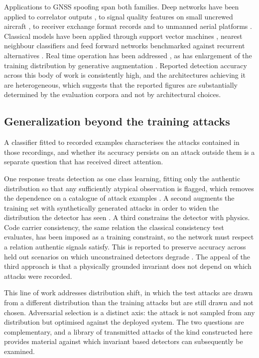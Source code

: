 Applications to GNSS spoofing span both families. Deep networks have been applied to
correlator outputs \citep{borhanidarian2024deep}, to signal quality features on small
uncrewed aircraft \citep{sung2022cnn}, to receiver exchange format records
\citep{romaniuc2025lstm} and to unmanned aerial platforms \citep{yang2025deep}. Classical
models have been applied through support vector machines \citep{chen2022svm}, nearest
neighbour classifiers \citep{mahroof2024ml} and feed forward networks benchmarked against
recurrent alternatives \citep{jullian2022deep}. Real time operation has been addressed
\citep{li2025realtime}, as has enlargement of the training distribution by generative
augmentation \citep{chen2025cgan}. Reported detection accuracy across this body of work is
consistently high, and the architectures achieving it are heterogeneous, which suggests
that the reported figures are substantially determined by the evaluation corpora and
not by architectural choices.

\subsection{Generalization beyond the training attacks}
\label{sec:rw_generalization}

A classifier fitted to recorded examples characterises the attacks contained in those
recordings, and whether its accuracy persists on an attack outside them is a separate
question that has received direct attention.

One response treats detection as one class learning, fitting only the authentic
distribution so that any sufficiently atypical observation is flagged, which removes the
dependence on a catalogue of attack examples \citep{iqbal2024deep}. A second augments the
training set with synthetically generated attacks in order to widen the distribution the
detector has seen \citep{chen2025cgan}. A third constrains the detector with physics.
Code carrier consistency, the same relation the classical consistency test evaluates, has
been imposed as a training constraint, so the network must respect a relation authentic
signals satisfy. This is reported to preserve accuracy across held out scenarios on which
unconstrained detectors degrade \citep{song2026generalized}.
The appeal of the third approach is that a physically grounded invariant does not depend
on which attacks were recorded.

This line of work addresses distribution shift, in which the test attacks are drawn from a
different distribution than the training attacks but are still drawn and not chosen.
Adversarial selection is a distinct axis: the attack is not sampled from any distribution
but optimised against the deployed system. The two questions are complementary, and a
library of transmitted attacks of the kind constructed here provides material against
which invariant based detectors can subsequently be examined.

